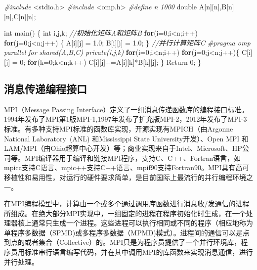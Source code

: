 \documentclass[]{ctexbook}
\newenvironment{Shaded}{\begin{snugshade}}{\end{snugshade}}
\newcommand{\CommentTok}[1]{\textcolor[rgb]{0.56,0.35,0.01}{\textit{#1}}}
\newcommand{\ControlFlowTok}[1]{\textcolor[rgb]{0.13,0.29,0.53}{\textbf{#1}}}
\newcommand{\DataTypeTok}[1]{\textcolor[rgb]{0.13,0.29,0.53}{#1}}
\newcommand{\DecValTok}[1]{\textcolor[rgb]{0.00,0.00,0.81}{#1}}
\newcommand{\FloatTok}[1]{\textcolor[rgb]{0.00,0.00,0.81}{#1}}
\newcommand{\ImportTok}[1]{#1}
\newcommand{\NormalTok}[1]{#1}
\newcommand{\PreprocessorTok}[1]{\textcolor[rgb]{0.56,0.35,0.01}{\textit{#1}}}
\begin{document}
\begin{Shaded}
\begin{Highlighting}[]
\PreprocessorTok{\#include }\ImportTok{\textless{}stdio.h\textgreater{}}
\PreprocessorTok{\#include }\ImportTok{\textless{}omp.h\textgreater{}}
\PreprocessorTok{\#define n 1000}
\DataTypeTok{double}\NormalTok{ A[n][n],B[n][n],C[n][n];}

\DataTypeTok{int}\NormalTok{ main()}
\NormalTok{\{}
    \DataTypeTok{int}\NormalTok{ i,j,k;}
   \CommentTok{//初始化矩阵A和矩阵B}
    \ControlFlowTok{for}\NormalTok{(i=}\DecValTok{0}\NormalTok{;i\textless{}n;i++)}
    \ControlFlowTok{for}\NormalTok{(j=}\DecValTok{0}\NormalTok{;j\textless{}n;j++) \{}
\NormalTok{        A[i][j] = }\FloatTok{1.0}\NormalTok{;}
\NormalTok{        B[i][j] = }\FloatTok{1.0}\NormalTok{;}
\NormalTok{    \}   }
    \CommentTok{//并行计算矩阵C}
    \PreprocessorTok{\#pragma omp parallel for shared(A,B,C) private(i,j,k)}
    \ControlFlowTok{for}\NormalTok{(i=}\DecValTok{0}\NormalTok{;i\textless{}n;i++)}
    \ControlFlowTok{for}\NormalTok{(j=}\DecValTok{0}\NormalTok{;j\textless{}n;j++)\{}
\NormalTok{        C[i][j] = }\DecValTok{0}\NormalTok{;}
    \ControlFlowTok{for}\NormalTok{(k=}\DecValTok{0}\NormalTok{;k\textless{}n;k++)}
\NormalTok{        C[i][j]+=A[i][k]*B[k][j];}
\NormalTok{     \}}
\NormalTok{    Return }\DecValTok{0}\NormalTok{;}
\NormalTok{\}}
\end{Highlighting}
\end{Shaded}

\hypertarget{ux6d88ux606fux4f20ux9012ux7f16ux7a0bux63a5ux53e3}{%
\subsection{消息传递编程接口}\label{ux6d88ux606fux4f20ux9012ux7f16ux7a0bux63a5ux53e3}}

MPI（Message Passing Interface）定义了一组消息传递函数库的编程接口标准。1994年发布了MPI第1版MPI-1,1997年发布了扩充版MPI-2，2012年发布了MPI-3标准。有多种支持MPI标准的函数库实现，开源实现有MPICH（由Argonne National Laboratory~(ANL) 和Mississippi State University开发）、Open MPI 和LAM/MPI（由Ohio超算中心开发）等；商业实现来自于Intel、Microsoft、HP公司等。MPI编译器用于编译和链接MPI程序，支持C、C++、Fortran语言，如mpicc支持C语言、mpic++支持C++语言、mpif90支持Fortran90。MPI具有高可移植性和易用性，对运行的硬件要求简单，是目前国际上最流行的并行编程环境之一。

在MPI编程模型中，计算由一个或多个通过调用库函数进行消息收/发通信的进程所组成。在绝大部分MPI实现中，一组固定的进程在程序初始化时生成，在一个处理器核上通常只生成一个进程。这些进程可以执行相同或不同的程序（相应地称为单程序多数据（SPMD)或多程序多数据（MPMD)模式）。进程间的通信可以是点到点的或者集合（Collective）的。MPI只是为程序员提供了一个并行环境库，程序员用标准串行语言编写代码，并在其中调用MPI的库函数来实现消息通信，进行并行处理。
\end{document}
